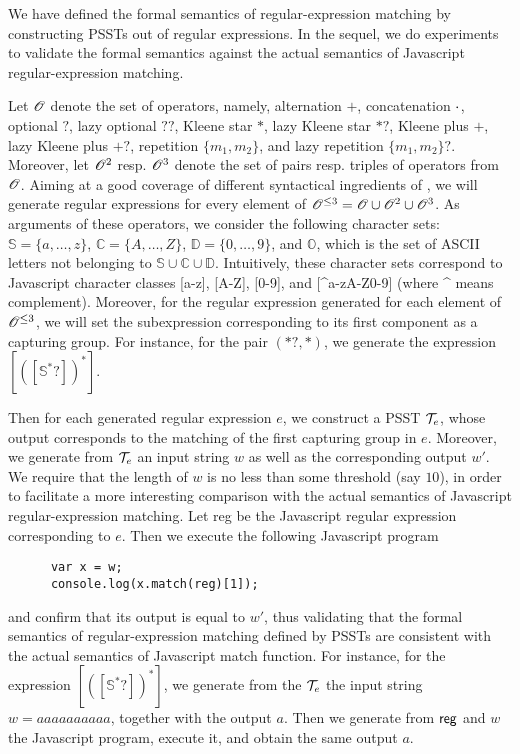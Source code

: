 
We have defined the formal semantics of regular-expression matching by constructing PSSTs out of regular expressions. 
In the sequel, we do experiments to validate the formal semantics against the actual semantics of Javascript regular-expression matching.

Let $\mathscr{O}$ denote the set of {\regexp} operators, namely, alternation $+$, concatenation $\cdot$, optional $?$, lazy optional $??$, Kleene star $*$, lazy Kleene star $*?$, Kleene plus $+$, lazy Kleene plus $+?$, repetition $\{m_1,m_2\}$, and lazy repetition $\{m_1,m_2\}?$. Moreover, let $\mathscr{O}^{2}$ resp. $\mathscr{O}^{3}$ denote the set of pairs resp. triples of operators from $\mathscr{O}$. 
Aiming at a good coverage of different syntactical ingredients of {\regexp}, we will generate regular expressions for every element of $\mathscr{O}^{\le 3} = \mathscr{O} \cup \mathscr{O}^2 \cup \mathscr{O}^3$.
As arguments of these operators, we consider the following character sets: $\mathbb{S} = \{a, \ldots, z\}$, $\mathbb{C}=\{A, \ldots, Z\}$, $\mathbb{D} = \{0,\ldots,9\}$, and $\mathbb{O}$, which is the set of ASCII letters not belonging to $\mathbb{S} \cup \mathbb{C} \cup \mathbb{D}$.
Intuitively, these character sets correspond to Javascript character classes [a-z], [A-Z], [0-9], and [{\textasciicircum}a-zA-Z0-9] (where {\textasciicircum} means complement).
Moreover, for the regular expression generated for each element of $\mathscr{O}^{\le 3}$, we will set the subexpression corresponding to its first component as a capturing group. 
For instance, for the pair $(*?, *)$, we generate the {\regexp} expression $[([\mathbb{S}^*?])^{*}]$.

Then for each generated regular expression $e$, we construct a PSST $\mathcal{T}_e$, whose output corresponds to the matching of the first capturing group in $e$.  Moreover, we generate from $\mathcal{T}_e$ an input string $w$ as well as the corresponding output $w'$. We require that the length of $w$ is no less than some threshold (say $10$), in order to facilitate a more interesting comparison with the actual semantics of Javascript regular-expression matching. 
Let {\sf reg} be the Javascript regular expression corresponding to $e$. Then we execute the following Javascript program 
\begin{center}
{
\small
\begin{verbatim}
      var x = w; 
      console.log(x.match(reg)[1]);
\end{verbatim}
}
\end{center}
and confirm that its output is equal to $w'$, thus validating that the formal semantics of  regular-expression matching defined by PSSTs are consistent with the actual semantics of Javascript {\sf match} function. For instance, for the {\regexp} expression $[([\mathbb{S}^*?])^{*}]$, we generate from the $\mathcal{T}_e$ the input string $w= aaaaaaaaaa$, together with the output $a$. Then we generate from ${\sf reg}$ and $w$ the Javascript program, execute it, and obtain the same output $a$.